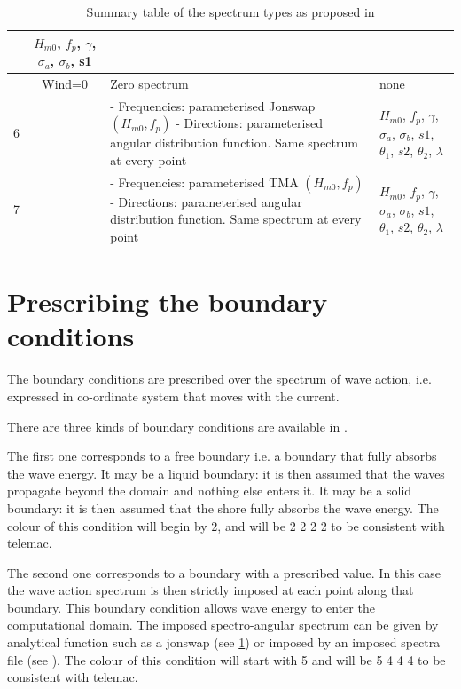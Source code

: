 \begin{table}
\begin{tabular}{|c|c|p{2.2in}|p{1.8in}|}
& $H_{m0}$, $ f_p$, $ \gamma $, $ \sigma_a$, $ \sigma_b$, s1 \\ \hline
 & Wind=0 & Zero spectrum & none \\ \hline
6 &  & - Frequencies: parameterised Jonswap  $(H_{m0}, f_p)$  \newline - Directions: parameterised angular distribution function.
Same spectrum at every point& $H_{m0}$, $ f_p$, $ \gamma $, $ \sigma_a$, $ \sigma_b$, $s1$, $ \theta_1$, $ s2$, $ \theta_2$, $ \lambda$ \\
\hline
7 &  & - Frequencies: parameterised TMA $(H_{m0}, f_p)$ \newline - Directions: parameterised angular distribution function. Same
spectrum at every point & $H_{m0}$, $ f_p$, $ \gamma $, $ \sigma_a$, $ \sigma_b$, $s1$, $ \theta_1$, $ s2$, $ \theta_2$, $ \lambda$ \\
\hline
\end{tabular}
\caption{\label{tab:Jonswap}Summary table of the spectrum types as proposed in \tomawac}
\end{table}



\section{  Prescribing the boundary conditions}

The boundary conditions are prescribed over the  spectrum of wave action, i.e. expressed in co-ordinate system
that moves with the current.

 There are three kinds of boundary conditions are available in \tomawac.

 The first one corresponds to a free boundary i.e. a boundary that fully absorbs the wave energy. It may be a liquid boundary: it
 is then assumed that the waves propagate beyond the domain and nothing else enters it. It may be a solid boundary: it is
 then assumed that the shore fully absorbs the wave energy. The colour of this condition will begin by 2, and will be 2 2 2 2
 to be consistent with telemac.
 
 The second one corresponds to a boundary with a prescribed value. In this case the wave action spectrum is then strictly imposed at
 each point along that boundary. This boundary condition allows wave energy to enter the computational domain. The imposed
 spectro-angular spectrum can be given by analytical function such as a jonswap (see \ref{tab:Jonswap}) or imposed by an imposed spectra file (see
 \label{se:ImpSpeCoorFiles}). The colour of this condition will start with 5 and will be 5 4 4 4 to be consistent with telemac.

